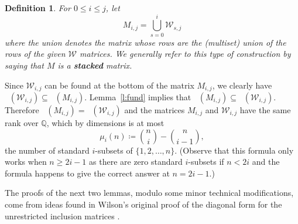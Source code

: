 \documentclass[11pt]{article}
\newtheorem{definition}[theo]{Definition}
\theoremstyle{definition}
\numberwithin{equation}{section}
\numberwithin{equation}{section}
\newcommand{\Q}[0]{\mathbb{Q}}
\DeclareMathOperator{\rowq}{row_{\mathbb{Q}}}
\newcommand{\W}{\mathcal{W}}
\begin{document}
\begin{definition}\label{d:stack}
For $0 \leq i \leq j$, let
\[ M_{i,j} = \bigcup_{s=0}^{i}\W_{s,j} \]
where the union denotes the matrix whose rows are the (multiset) union of the rows of the given $\W$ matrices.  We generally refer to this type of construction by saying that $M$ is a {\bf stacked} matrix.
\end{definition}

Since $\W_{i,j}$ can be found at the bottom of the matrix $M_{i,j}$, we clearly have $\rowq(\W_{i,j}) \subseteq \rowq(M_{i,j})$.  Lemma~\ref{l:fund} implies that $\rowq(M_{i,j}) \subseteq \rowq(\W_{i,j})$.  Therefore $\rowq(M_{i,j}) = \rowq(\W_{i,j})$ and the matrices $M_{i,j}$ and $\W_{i,j}$ have the same rank over $\Q$, which by dimensions is at most 
\[ \mu_{i}(n) \coloneqq  \binom{n}{i} - \binom{n}{i-1}, \]
the number of standard $i$-subsets of $\{1, 2, \ldots, n\}$.  (Observe that this formula only works when $n \geq 2i-1$ as there are zero standard $i$-subsets if $n < 2i$ and the formula happens to give the correct answer at $n = 2i-1$.)  

The proofs of the next two lemmas, modulo some minor technical modifications, come from ideas found in Wilson's original proof of the diagonal form for the unrestricted inclusion matrices \cite{wilson_classic}.
\end{document}
